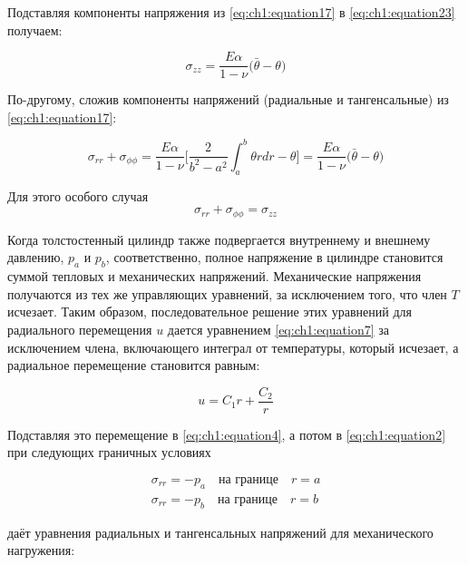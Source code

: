 Подставляя компоненты напряжения из \cref{eq:ch1:equation17} в \cref{eq:ch1:equation23} получаем:

\begin{equation}
	\label{eq:ch1:equation25}
	\sigma_{zz} = \frac{E \alpha}{1 - \nu} \big ( \bar{\theta} - \theta \big )
\end{equation}

По-другому, сложив компоненты напряжений (радиальные и тангенсальные) из \cref{eq:ch1:equation17}:

\begin{equation}
	\label{eq:ch1:equation26}
	\sigma_{rr} + \sigma_{\phi\phi} = \frac{E \alpha}{1-\nu} \big [\frac{2}{b^2 - a^2} \int_a^b \theta rdr - \theta \big] = \frac{E \alpha}{1 - \nu} \big ( \bar{\theta} - \theta \big )
\end{equation}

Для этого особого случая
\begin{equation}
	\label{eq:ch1:equation27}
	\sigma_{rr} + \sigma_{\phi\phi} = \sigma_{zz}
\end{equation}

Когда толстостенный цилиндр также подвергается внутреннему и внешнему давлению, \(p_a\) и \(p_b\), соответственно, полное напряжение в цилиндре становится суммой тепловых и механических напряжений. Механические напряжения получаются из тех же управляющих уравнений, за исключением того, что член \(T\) исчезает. Таким образом, последовательное решение этих уравнений для радиального перемещения \(u\) дается уравнением \cref{eq:ch1:equation7} за исключением члена, включающего интеграл от
температуры, который исчезает, а радиальное перемещение становится равным:

\begin{equation}
	\label{eq:ch1:equation28}
	u = C_1 r + \frac{C_2}{r}
\end{equation}

Подставляя это перемещение в \cref{eq:ch1:equation4}, а потом в \cref{eq:ch1:equation2} при следующих граничных условиях

\begin{equation}
	\label{eq:ch1:equation29}
	\begin{split}
		\sigma_{rr} = -p_a \quad \text{на границе} \quad r=a \\
		\sigma_{rr} = -p_b \quad \text{на границе} \quad r=b
	\end{split}
\end{equation}

даёт уравнения радиальных и тангенсальных напряжений для механического нагружения:

